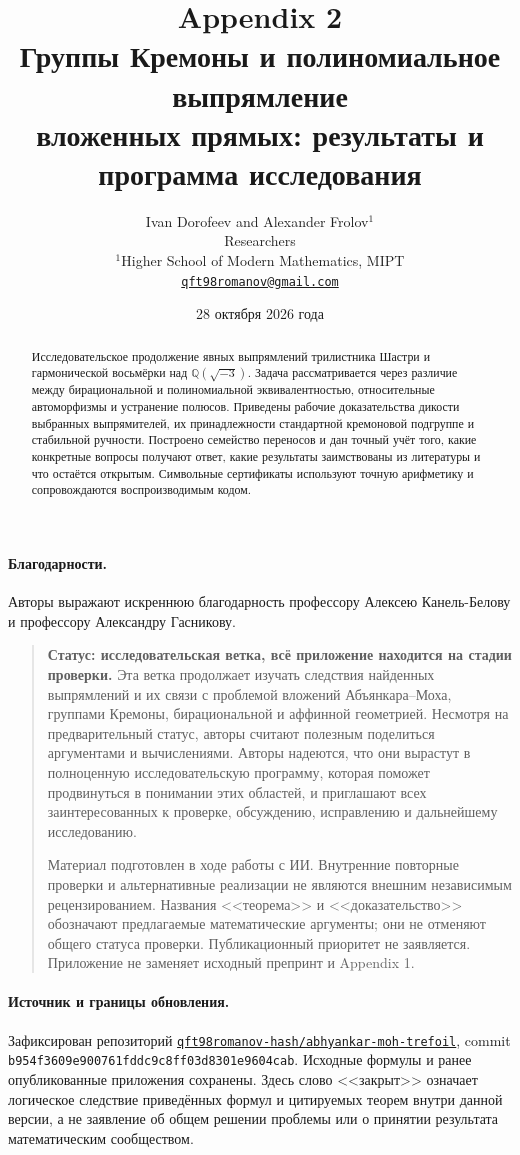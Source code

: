 \documentclass[11pt,a4paper]{article}
\title{\vspace{-12mm}\LARGE\bfseries Appendix 2\\[4pt]
 Группы Кремоны и полиномиальное выпрямление\\
 вложенных прямых: результаты и программа исследования}
\author{Ivan Dorofeev and Alexander Frolov$^{1}$\\[3pt]\normalsize Researchers\\
 \normalsize $^{1}$Higher School of Modern Mathematics, MIPT\\
 \normalsize\href{mailto:qft98romanov@gmail.com}{\texttt{qft98romanov@gmail.com}}}
\date{28 октября 2026 года}
\theoremstyle{definition}
\theoremstyle{remark}
\newcommand{\Q}{{\mathbb Q}}
\begin{document}
\maketitle
\begin{abstract}
Исследовательское продолжение явных выпрямлений трилистника Шастри и
гармонической восьмёрки над $\Q(\sqrt{-3})$. Задача рассматривается через
различие между бирациональной и полиномиальной эквивалентностью, относительные
автоморфизмы и устранение полюсов. Приведены рабочие доказательства дикости
выбранных выпрямителей, их принадлежности стандартной кремоновой подгруппе
и стабильной ручности. Построено семейство переносов и дан точный учёт
того, какие конкретные вопросы получают ответ, какие результаты заимствованы
из литературы и что остаётся открытым. Символьные сертификаты используют
точную арифметику и сопровождаются воспроизводимым кодом.
\end{abstract}

\paragraph{Благодарности.}
Авторы выражают искреннюю благодарность профессору Алексею Канель-Белову
и профессору Александру Гасникову.


\begin{quote}\small
\textbf{Статус: исследовательская ветка, всё приложение находится на стадии проверки.}
Эта ветка продолжает изучать следствия найденных выпрямлений и их связи
с проблемой вложений Абъянкара--Моха, группами Кремоны, бирациональной
и аффинной геометрией. Несмотря на предварительный статус, авторы считают
полезным поделиться аргументами и вычислениями. Авторы надеются, что они
вырастут в полноценную исследовательскую программу, которая поможет
продвинуться в понимании этих областей, и приглашают всех заинтересованных
к проверке, обсуждению, исправлению и дальнейшему исследованию.

Материал подготовлен в ходе работы с ИИ. Внутренние повторные проверки и
альтернативные реализации не являются внешним независимым рецензированием.
Названия <<теорема>> и <<доказательство>> обозначают предлагаемые математические
аргументы; они не отменяют общего статуса проверки. Публикационный приоритет
не заявляется. Приложение не заменяет исходный препринт и Appendix 1.
\end{quote}

\paragraph{Источник и границы обновления.}
Зафиксирован репозиторий
\href{https://github.com/qft98romanov-hash/abhyankar-moh-trefoil/tree/b954f3609e900761fddc9c8ff03d8301e9604cab}{\nolinkurl{qft98romanov-hash/abhyankar-moh-trefoil}},
commit \nolinkurl{b954f3609e900761fddc9c8ff03d8301e9604cab}.
Исходные формулы и ранее опубликованные приложения сохранены.
Здесь слово <<закрыт>> означает логическое следствие приведённых формул
и цитируемых теорем внутри данной версии, а не заявление об общем решении
проблемы или о принятии результата математическим сообществом.

\tableofcontents






\end{document}
